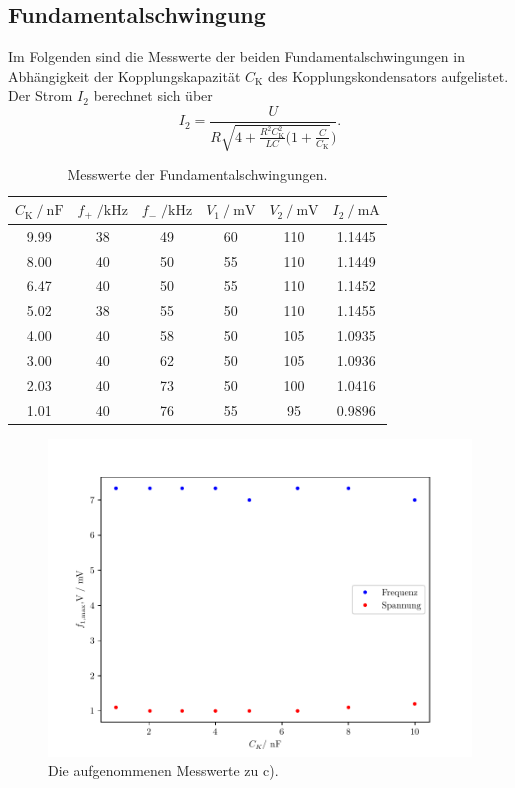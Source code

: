 \subsection{Fundamentalschwingung}
Im Folgenden sind die Messwerte der beiden Fundamentalschwingungen in Abhängigkeit der Kopplungskapazität $C_{\text{K}}$ des Kopplungskondensators
aufgelistet. Der Strom $I_2$ berechnet sich über
\begin{equation}
  I_2  = \frac{U}{R\sqrt{4 + \frac{R^2C_{\text{K}}^2}{LC}(1 + \frac{C}{C_{\text{K}}}})}.
\end{equation}

\begin{table}[H]
  \centering
  \caption{Messwerte der Fundamentalschwingungen.}
  \label{tab:aufgabeC}
  \begin{tabular}{c c c c c c}
      \toprule
      {$C_{\text{K}} \:/\: \si{\nano\farad}$} & {$f_+\;/ \si{\kilo\hertz}$} & {$f_-\;/ \si{\kilo\hertz}$} & {$V_1 \:/\: \si{\milli\volt}$} & {$V_2 \:/\: \si{\milli\volt}$} & $I_2 \:/\:\si{\milli\ampere}$ \\
      \midrule
      9.99 & 38 & 49 & 60 & 110 & 1.1445 \\
      8.00 & 40 & 50 & 55 & 110 & 1.1449 \\
      6.47 & 40 & 50 & 55 & 110 & 1.1452 \\
      5.02 & 38 & 55 & 50 & 110 & 1.1455 \\
      4.00 & 40 & 58 & 50 & 105 & 1.0935 \\
      3.00 & 40 & 62 & 50 & 105 & 1.0936 \\
      2.03 & 40 & 73 & 50 & 100 & 1.0416 \\
      1.01 & 40 & 76 & 55 & 95 & 0.9896 \\
      \bottomrule
  \end{tabular}
\end{table}


\begin{figure}[H]
  \centering
  \includegraphics{freq1.pdf}
  \caption{Die aufgenommenen Messwerte zu c).}
  \label{fig:freq1}
\end{figure}

